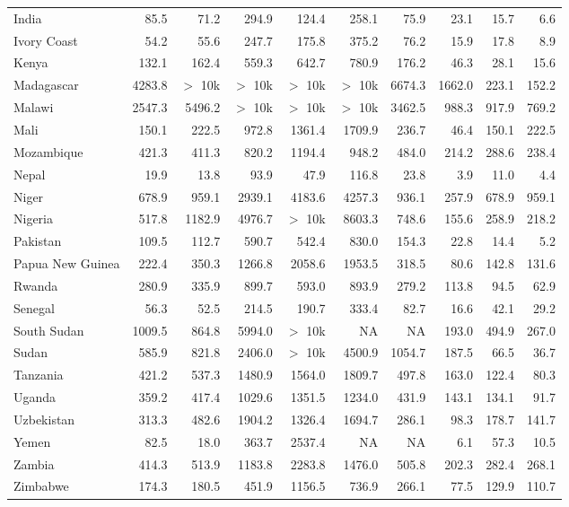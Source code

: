\begin{table}[b]
{\begin{tabular}[t]{lrrrrrrrrr}
India & 85.5 & 71.2 & 294.9 & 124.4 & 258.1 & 75.9 & 23.1 & 15.7 & 6.6\\
Ivory Coast & 54.2 & 55.6 & 247.7 & 175.8 & 375.2 & 76.2 & 15.9 & 17.8 & 8.9\\
Kenya & 132.1 & 162.4 & 559.3 & 642.7 & 780.9 & 176.2 & 46.3 & 28.1 & 15.6\\
Madagascar & 4283.8 & $>$ 10k & $>$ 10k & $>$ 10k & $>$ 10k & 6674.3 & 1662.0 & 223.1 & 152.2\\
Malawi & 2547.3 & 5496.2 & $>$ 10k & $>$ 10k & $>$ 10k & 3462.5 & 988.3 & 917.9 & 769.2\\
Mali & 150.1 & 222.5 & 972.8 & 1361.4 & 1709.9 & 236.7 & 46.4 & 150.1 & 222.5\\
Mozambique & 421.3 & 411.3 & 820.2 & 1194.4 & 948.2 & 484.0 & 214.2 & 288.6 & 238.4\\
Nepal & 19.9 & 13.8 & 93.9 & 47.9 & 116.8 & 23.8 & 3.9 & 11.0 & 4.4\\
Niger & 678.9 & 959.1 & 2939.1 & 4183.6 & 4257.3 & 936.1 & 257.9 & 678.9 & 959.1\\
Nigeria & 517.8 & 1182.9 & 4976.7 & $>$ 10k & 8603.3 & 748.6 & 155.6 & 258.9 & 218.2\\
Pakistan & 109.5 & 112.7 & 590.7 & 542.4 & 830.0 & 154.3 & 22.8 & 14.4 & 5.2\\
Papua New Guinea & 222.4 & 350.3 & 1266.8 & 2058.6 & 1953.5 & 318.5 & 80.6 & 142.8 & 131.6\\
Rwanda & 280.9 & 335.9 & 899.7 & 593.0 & 893.9 & 279.2 & 113.8 & 94.5 & 62.9\\
Senegal & 56.3 & 52.5 & 214.5 & 190.7 & 333.4 & 82.7 & 16.6 & 42.1 & 29.2\\
South Sudan & 1009.5 & 864.8 & 5994.0 & $>$ 10k & NA & NA & 193.0 & 494.9 & 267.0\\
Sudan & 585.9 & 821.8 & 2406.0 & $>$ 10k & 4500.9 & 1054.7 & 187.5 & 66.5 & 36.7\\
Tanzania & 421.2 & 537.3 & 1480.9 & 1564.0 & 1809.7 & 497.8 & 163.0 & 122.4 & 80.3\\
Uganda & 359.2 & 417.4 & 1029.6 & 1351.5 & 1234.0 & 431.9 & 143.1 & 134.1 & 91.7\\
Uzbekistan & 313.3 & 482.6 & 1904.2 & 1326.4 & 1694.7 & 286.1 & 98.3 & 178.7 & 141.7\\
Yemen & 82.5 & 18.0 & 363.7 & 2537.4 & NA & NA & 6.1 & 57.3 & 10.5\\
Zambia & 414.3 & 513.9 & 1183.8 & 2283.8 & 1476.0 & 505.8 & 202.3 & 282.4 & 268.1\\
Zimbabwe & 174.3 & 180.5 & 451.9 & 1156.5 & 736.9 & 266.1 & 77.5 & 129.9 & 110.7\\
\bottomrule
\end{tabular}}
\end{table}
